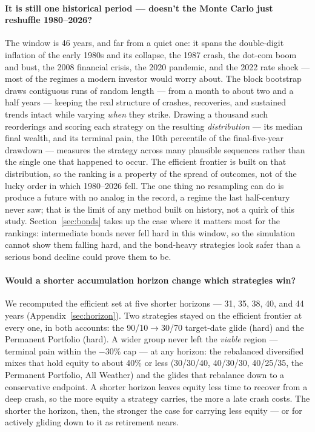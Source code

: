 \documentclass[11pt]{article}
\begin{document}
\paragraph{It is still one historical period --- doesn't the Monte Carlo just reshuffle 1980--2026?} The
window is 46 years, and far from a quiet one: it spans the double-digit inflation of the early 1980s and
its collapse, the 1987 crash, the dot-com boom and bust, the 2008 financial crisis, the 2020 pandemic,
and the 2022 rate shock --- most of the regimes a modern investor would worry about. The block bootstrap
draws contiguous runs of random length --- from a month to about two and a half years --- keeping the
real structure of crashes, recoveries, and sustained trends intact while varying \emph{when} they
strike. Drawing a thousand such reorderings and scoring each
strategy on the resulting \emph{distribution} --- its median final wealth, and its terminal pain, the
10th percentile of the final-five-year drawdown --- measures the strategy across many plausible sequences
rather than the single one that happened to occur. The efficient frontier is built on that distribution,
so the ranking is a property of the spread of outcomes, not of the lucky order in which 1980--2026 fell.
The one thing no resampling can do is produce a future with no analog in the record, a regime the last
half-century never saw; that is the limit of any method built on history, not a quirk of this study. Section~\ref{sec:bonds} takes up the case where it
matters most for the rankings: intermediate bonds never fell hard in this window, so the simulation
cannot show them falling hard, and the bond-heavy strategies look safer than a serious bond decline could
prove them to be.

\paragraph{Would a shorter accumulation horizon change which strategies win?} We recomputed the efficient
set at five shorter horizons --- 31, 35, 38, 40, and 44 years (Appendix~\ref{sec:horizon}). Two strategies stayed on
the efficient frontier at every one, in both accounts: the 90/10$\to$30/70 target-date glide (hard) and
the Permanent Portfolio (hard). A wider group never left the \emph{viable} region --- terminal pain
within the $-30\%$ cap --- at any horizon: the rebalanced diversified mixes that hold equity to about
40\% or less (30/30/40, 40/30/30, 40/25/35, the Permanent Portfolio, All Weather) and the glides that
rebalance down to a conservative endpoint. A shorter horizon leaves equity less time to recover from a
deep crash, so the more equity a strategy carries, the more a late crash costs. The shorter the horizon, then, the stronger the case for carrying less equity --- or for
actively gliding down to it as retirement nears.
\end{document}
